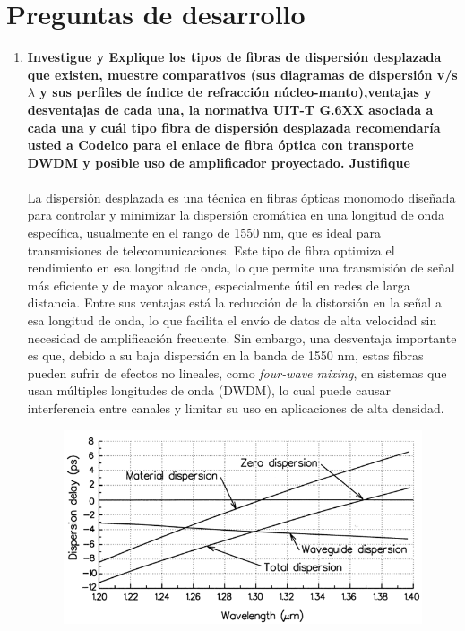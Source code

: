

\section{Preguntas de desarrollo}

\begin{enumerate}
	\item \textbf{ Investigue y Explique los tipos de fibras de dispersión desplazada que existen, muestre comparativos (sus diagramas de dispersión v/s $\lambda$ y sus perfiles de índice de refracción núcleo-manto),ventajas y desventajas de cada una, la normativa UIT-T G.6XX asociada a cada una y cuál tipo fibra de dispersión desplazada recomendaría usted a Codelco para el enlace de fibra óptica con transporte DWDM y posible uso de amplificador proyectado. Justifique}\\\\
	La dispersión desplazada es una técnica en fibras ópticas monomodo diseñada para controlar y minimizar la dispersión cromática en una longitud de onda específica, usualmente en el rango de 1550 nm, que es ideal para transmisiones de telecomunicaciones. Este tipo de fibra optimiza el rendimiento en esa longitud de onda, lo que permite una transmisión de señal más eficiente y de mayor alcance, especialmente útil en redes de larga distancia. Entre sus ventajas está la reducción de la distorsión en la señal a esa longitud de onda, lo que facilita el envío de datos de alta velocidad sin necesidad de amplificación frecuente. Sin  embargo, una desventaja importante es que, debido a su baja dispersión en la banda de 1550 nm, estas fibras pueden sufrir de efectos no lineales, como \textit{four-wave mixing}, en sistemas que usan múltiples longitudes de onda (DWDM), lo cual puede causar interferencia entre canales y limitar su uso en aplicaciones de alta densidad.
	\begin{figure}
		\centering
		\includegraphics[width=0.7\linewidth]{img/Figure_1_0}

\end{figure}
\end{enumerate}
